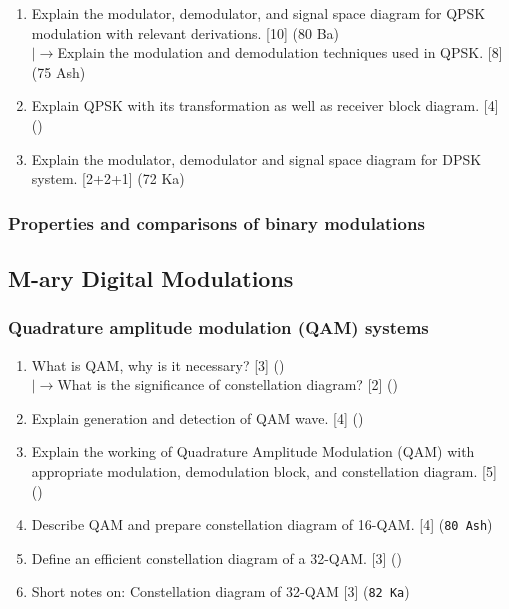\documentclass[12pt]{article}
\newcommand{\lb}{\\$\left|\rightarrow\right.$}
\begin{document}
\begin{enumerate}
        \item Explain the modulator, demodulator, and signal space diagram for QPSK modulation with relevant derivations. \hfill [10] (80 Ba)
        \lb Explain the modulation and demodulation techniques used in QPSK. \hfill [8] (75 Ash)

        \item Explain QPSK with its transformation as well as receiver block diagram. \hfill [4] ()
        
        \item Explain the modulator, demodulator and signal space diagram for DPSK system. \hfill [2+2+1] (72 Ka)
      \end{enumerate}

    \subsubsection{Properties and comparisons of binary modulations}
  \subsection{M-ary Digital Modulations}
    \subsubsection{Quadrature amplitude modulation (QAM) systems}
      \begin{enumerate}
        \item What is QAM, why is it necessary? \hfill [3] ()
        \lb What is the significance of constellation diagram? \hfill [2] ()
 
        \item Explain generation and detection of QAM wave. [4] ()
        
        \item Explain the working of Quadrature Amplitude Modulation (QAM) with appropriate modulation, demodulation block, and constellation diagram. \hfill [5] ()

        \item Describe QAM and prepare constellation diagram of 16-QAM. \hfill [4] (\texttt{80 Ash})
          
        \item Define an efficient constellation diagram of a 32-QAM. \hfill [3] ()

        \item Short notes on: Constellation diagram of 32-QAM \hfill [3] (\texttt{82 Ka})
      \end{enumerate}
\end{document}
